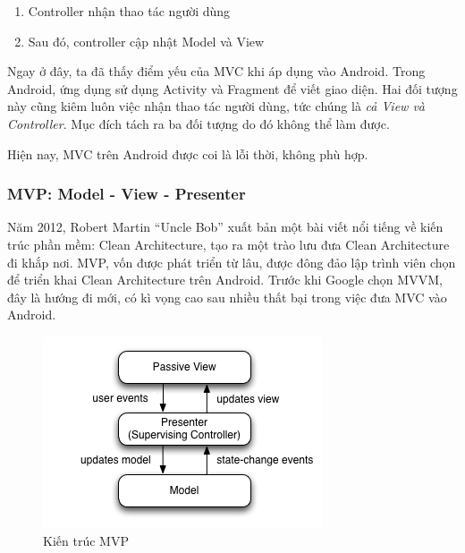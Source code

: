 \documentclass[../../thesis]{subfiles}
\begin{document}
\begin{enumerate}
    \item
        Controller nhận thao tác người dùng
    \item
        Sau đó, controller cập nhật Model và View
\end{enumerate}

Ngay ở đây, ta đã thấy điểm yếu của MVC khi áp dụng vào Android. Trong Android,
ứng dụng sử dụng Activity và Fragment để viết giao diện. Hai đối tượng này cũng
kiêm luôn việc nhận thao tác người dùng, tức chúng là \emph{cả View và
Controller}. Mục đích tách ra ba đối tượng do đó không thể làm được.

Hiện nay, MVC trên Android được coi là lỗi thời, không phù hợp.

\subsubsection{MVP: Model - View - Presenter}

Năm 2012, Robert Martin ``Uncle Bob'' xuất bản một bài viết nổi tiếng về
kiến trúc phần mềm: Clean Architecture, tạo ra một trào lưu đưa Clean
Architecture đi khắp nơi. MVP, vốn được phát triển từ lâu, được đông đảo
lập trình viên chọn để triển khai Clean Architecture trên Android. Trước
khi Google chọn MVVM, đây là hướng đi mới, có kì vọng cao sau nhiều thất
bại trong việc đưa MVC vào Android.

\begin{figure}
    \centering
    \includegraphics[width=\linewidth]{../images/Model_View_Presenter_GUI_Design_Pattern.png}
    \vspace*{-10mm}
    \caption{Kiến trúc MVP \cite{WIKI_MVP}}
    \label{fig:mvp}
\end{figure}
\end{document}
